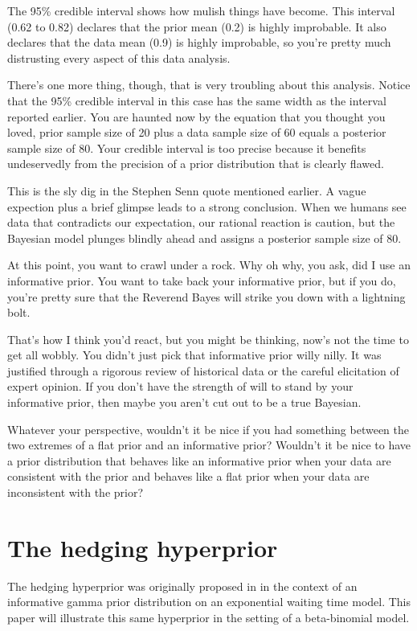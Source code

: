 \documentclass[12pt]{article}
\begin{document}
The 95\% credible interval shows how mulish things have become. This interval (0.62 to 0.82) declares that the prior mean (0.2) is highly improbable. It also declares that the data mean (0.9) is highly improbable, so you're pretty much distrusting every aspect of this data analysis.

There's one more thing, though, that is very troubling about this analysis. Notice that the 95\% credible interval in this case has the same width as the interval reported earlier. You are haunted now by the equation that you thought you loved, prior sample size of 20 plus a data sample size of 60 equals a posterior sample size of 80. Your credible interval is too precise because it benefits undeservedly from the precision of a prior distribution that is clearly flawed. 

This is the sly dig in the Stephen Senn quote mentioned earlier. A vague expection plus a brief glimpse leads to a strong conclusion. When we humans see data that contradicts our expectation, our rational reaction is caution, but the Bayesian model plunges blindly ahead and assigns a posterior sample size of 80.

At this point, you want to crawl under a rock. Why oh why, you ask, did I use an informative prior. You want to take back your informative prior, but if you do, you're pretty sure that the Reverend Bayes will strike you down with a lightning bolt.

That's how I think you'd react, but you might be thinking, now's not the time to get all wobbly. You didn't just pick that informative prior willy nilly. It was justified through a rigorous review of historical data or the careful elicitation of expert opinion. If you don't have the strength of will to stand by your informative prior, then maybe you aren't cut out to be a true Bayesian.

Whatever your perspective, wouldn't it be nice if you had something between the two extremes of a flat prior and an informative prior? Wouldn't it be nice to have a prior distribution that behaves like an informative prior when your data are consistent with the prior and behaves like a flat prior when your data are inconsistent with the prior?

\section{The hedging hyperprior}
\label{sec:hh}

The hedging hyperprior was originally proposed in \cite{jiang15} in the context of an informative gamma prior distribution on an exponential waiting time model. This paper will illustrate this same hyperprior in the setting of a beta-binomial model.
\end{document}
